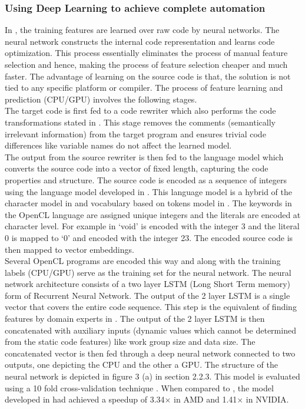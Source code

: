 \documentclass[a4paper,11pt]{article}
\begin{document}
  \subsubsection{Using Deep Learning to achieve complete automation}
   In \cite{first}, the training features are learned over raw code by neural networks. The neural network constructs the internal code representation and learns code optimization. This process essentially eliminates the process of manual feature selection and hence, making the process of feature selection cheaper and much faster. The advantage of learning on the source code is that, the solution is not tied to any specific platform or compiler. The process of feature learning and prediction (CPU/GPU) involves the following stages.\\
   \indent The target code is first fed to a code rewriter which also performs the code transformations stated in \cite{sixth}. This stage removes the comments (semantically irrelevant information) from the target program and ensures trivial code differences like variable names do not affect the learned model. \\
   \indent The output from the source rewriter is then fed to the language model which converts the source code into a vector of fixed length, capturing the code properties and structure.  The source code is encoded as a sequence of integers using the language model developed in \cite{first}.  This language model is a hybrid of the character model in \cite{sixth} and vocabulary based on tokens model in \cite{token}. The keywords in the OpenCL language are assigned unique integers and the literals are encoded at character level. For example in \cite{first} `void' is encoded with the integer 3 and the literal 0 is mapped to `0' and encoded with the integer 23. The encoded source code is then mapped to vector embeddings.\\
   \indent Several OpenCL programs are encoded this way and along with the training labels (CPU/GPU) serve as the training set for the neural network. The neural network architecture consists of a two layer LSTM (Long Short Term memory) form of Recurrent Neural Network. The output of the 2 layer LSTM is a single vector that covers the entire code sequence. This step is the equivalent of finding features by domain experts in \cite{second}. The output of the 2 layer LSTM is then concatenated with auxiliary inputs (dynamic values which cannot be determined from the static code features) like work group size and data size. The concatenated vector is then fed through a deep neural network connected to two outputs, one depicting the CPU and the other a GPU. The structure of the neural network is depicted in figure 3 (a) in section 2.2.3. This model is evaluated using a 10 fold cross-validation technique \cite{tenfold}. When compared to \cite{second}, the model developed in \cite{first} had achieved a speedup of 3.34$\times$ in AMD and 1.41$\times$ in NVIDIA.\\
\end{document}
